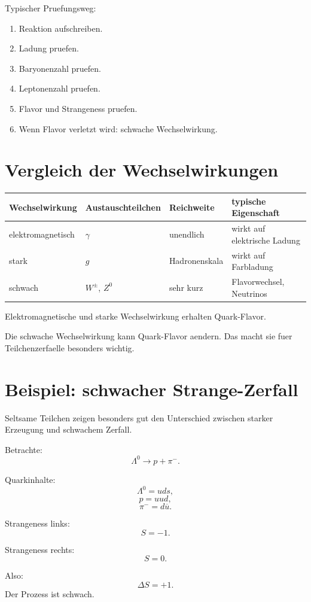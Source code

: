 \begin{examtipbox}
Typischer Pruefungsweg:
\begin{enumerate}
    \item Reaktion aufschreiben.
    \item Ladung pruefen.
    \item Baryonenzahl pruefen.
    \item Leptonenzahl pruefen.
    \item Flavor und Strangeness pruefen.
    \item Wenn Flavor verletzt wird: schwache Wechselwirkung.
\end{enumerate}
\end{examtipbox}

\section{Vergleich der Wechselwirkungen}

\begin{center}
\begin{tabular}{|p{3.6cm}|p{3.4cm}|p{3.5cm}|p{3.6cm}|}
\hline
Wechselwirkung & Austauschteilchen & Reichweite & typische Eigenschaft \\
\hline
elektromagnetisch & $\gamma$ & unendlich & wirkt auf elektrische Ladung \\
\hline
stark & $g$ & Hadronenskala & wirkt auf Farbladung \\
\hline
schwach & $W^\pm$, $Z^0$ & sehr kurz & Flavorwechsel, Neutrinos \\
\hline
\end{tabular}
\end{center}

\begin{conceptbox}
Elektromagnetische und starke Wechselwirkung erhalten Quark-Flavor.

Die schwache Wechselwirkung kann Quark-Flavor aendern.
Das macht sie fuer Teilchenzerfaelle besonders wichtig.
\end{conceptbox}

\section{Beispiel: schwacher Strange-Zerfall}

Seltsame Teilchen zeigen besonders gut den Unterschied zwischen starker Erzeugung
und schwachem Zerfall.

\begin{examplebox}
Betrachte:
\[
    \Lambda^0 \rightarrow p+\pi^-.
\]

Quarkinhalte:
\[
    \Lambda^0=uds,
\]
\[
    p=uud,
\]
\[
    \pi^-=d\overline{u}.
\]

Strangeness links:
\[
    S=-1.
\]

Strangeness rechts:
\[
    S=0.
\]

Also:
\[
    \Delta S=+1.
\]
Der Prozess ist schwach.
\end{examplebox}

